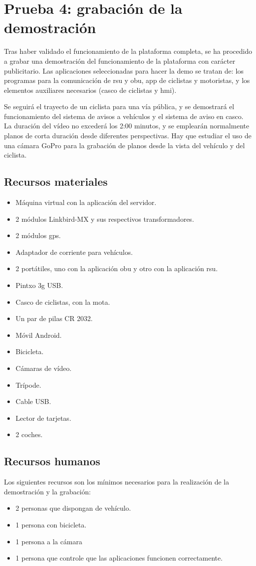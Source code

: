 \section{Prueba 4: grabación de la demostración}
Tras haber validado el funcionamiento de la plataforma completa, se ha procedido a grabar una demostración del funcionamiento de la plataforma con carácter publicitario. Las aplicaciones seleccionadas para hacer la demo se tratan de: los programas para la comunicación de \gls{rsu} y \gls{obu}, app de ciclistas y motoristas, y los elementos auxiliares necesarios (casco de ciclistas y \gls{hmi}). 

Se seguirá el trayecto de un ciclista para una vía pública, y se demostrará el funcionamiento del sistema de avisos a vehículos y el sistema de aviso en casco. La duración del vídeo no excederá los 2:00 minutos, y se emplearán normalmente planos de corta duración desde diferentes perspectivas. Hay que estudiar el uso de una cámara GoPro para la grabación de planos desde la vista del vehículo y del ciclista.

\subsection{Recursos materiales}
\begin{itemize}
	\item Máquina virtual con la aplicación del servidor.
	\item 2 módulos Linkbird-MX y sus respectivos transformadores.
	\item 2 módulos \gls{gps}.
	\item Adaptador de corriente para vehículos.
	\item 2 portátiles, uno con la aplicación \gls{obu} y otro con la aplicación \gls{rsu}.
	\item Pintxo \gls{3g} USB.
	\item Casco de ciclistas, con la mota.
	\item Un par de pilas CR 2032.
	\item Móvil Android.
	\item Bicicleta.
	\item Cámaras de vídeo.
	\item Trípode.
	\item Cable USB.
	\item Lector de tarjetas.
	\item 2 coches.
\end{itemize}

\subsection{Recursos humanos}
Los siguientes recursos son los mínimos necesarios para la realización de la demostración y la grabación:
\begin{itemize}
	\item 2 personas que dispongan de vehículo.
	\item 1 persona con bicicleta.
	\item 1 persona a la cámara
	\item 1 persona que controle que las aplicaciones funcionen correctamente.
\end{itemize}

